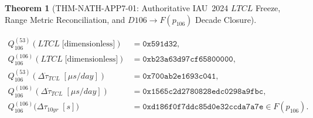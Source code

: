 \documentclass[11pt,a4paper,reqno]{article}
\def\texttt#1{#1}%
\def\mathrm#1{#1}%
\def\mathcal#1{#1}%
\def\mathbb#1{#1}%
\def\F#1{F(#1)}%
\def\Done{D106}%
\def\LTCL{LTCL}%
\theoremstyle{plain}
\newtheorem{theorem}{Theorem}[section]
\theoremstyle{definition}
\theoremstyle{remark}
\numberwithin{equation}{section}
\numberwithin{table}{section}
\newcommand{\F}[1]{\mathbb{F}_{#1}}
\newcommand{\Done}{\mathbb{D}_{106}}
\newcommand{\LTCL}{L_{\mathrm{TCL}}}
\begin{document}
\begin{theorem}[{\texttt{THM-NATH-APP7-01}: Authoritative IAU~2024 $\LTCL$ Freeze, Range Metric Reconciliation, and $\Done \to \F{p_{106}}$ Decade Closure}]
\begin{enumerate}[label=(\roman*)]
  {\footnotesize
  \begin{align}
    \mathcal{Q}_{106}^{(53)}(\LTCL\;\text{[dimensionless]}) &= \mathtt{0x591d32}, \\
    \mathcal{Q}_{106}^{(106)}(\LTCL\;\text{[dimensionless]}) &= \mathtt{0xb23a63d97cf65800000}, \\
    \mathcal{Q}_{106}^{(53)}(\Delta\dot{\tau}_{\mathrm{TCL}}\;[\mu\mathrm{s/day}])
      &= \mathtt{0x700ab2e1693c041}, \\
    \mathcal{Q}_{106}^{(106)}(\Delta\dot{\tau}_{\mathrm{TCL}}\;[\mu\mathrm{s/day}])
      &= \mathtt{0x1565c2d2780828edc0298a9fbc}, \\
    \mathcal{Q}_{106}^{(106)}\big(\Delta\tau_{10\mathrm{yr}}\;[\mathrm{s}]\big)
      &= \mathtt{0xd186f0f7ddc85d0e32ccda7a7e}
      \in \F{p_{106}}.
  \end{align}
  \par}
\end{enumerate}
\end{theorem}
\end{document}
